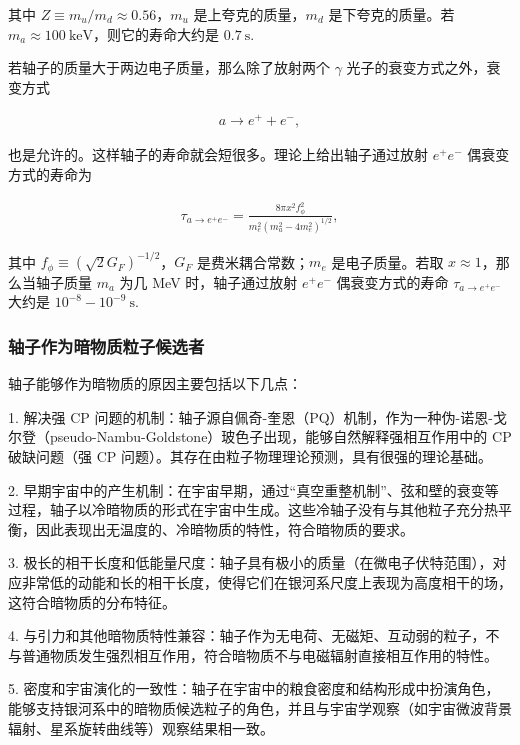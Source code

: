 其中 $Z\equiv m_u/m_d \approx 0.56$，$m_u$ 是上夸克的质量，$m_d$ 是下夸克的质量。若 $m_a\approx 100~\mathrm{keV}$，则它的寿命大约是 $0.7~\mathrm{s} .$

若轴子的质量大于两边电子质量，那么除了放射两个 $\gamma$ 光子的衰变方式之外，衰变方式

\begin{align}
a \to e^+ + e^-,
\end{align}

也是允许的。这样轴子的寿命就会短很多。理论上给出轴子通过放射 $e^+ e^-$ 偶衰变方式的寿命为

\begin{align}
\tau_{a\to e^+ e^-}
=\frac{8 \pi x^2 f_\phi^2}{m_e^2\left(m_a^2-4m_e^2 \right)^{1/2} } ,
\end{align}

其中 $f_\phi\equiv \left(\sqrt{2} G_F \right)^{-1/2}$，$G_F$ 是费米耦合常数；$m_e$ 是电子质量。若取 $x\approx 1$，那么当轴子质量 $m_a$ 为几 MeV 时，轴子通过放射 $e^+ e^-$ 偶衰变方式的寿命 $\tau_{a\to e^+ e^-}$ 大约是 $10^{-8} - 10^{-9}~\mathrm{s} .$

\subsubsection{轴子作为暗物质粒子候选者}

轴子能够作为暗物质的原因主要包括以下几点\cite{duffy2009axions}：

1. 解决强 CP 问题的机制：轴子源自佩奇-奎恩（PQ）机制，作为一种伪-诺恩-戈尔登（pseudo-Nambu-Goldstone）玻色子出现，能够自然解释强相互作用中的 CP 破缺问题（强 CP 问题）。其存在由粒子物理理论预测，具有很强的理论基础。

2. 早期宇宙中的产生机制：在宇宙早期，通过“真空重整机制”、弦和壁的衰变等过程，轴子以冷暗物质的形式在宇宙中生成。这些冷轴子没有与其他粒子充分热平衡，因此表现出无温度的、冷暗物质的特性，符合暗物质的要求。

3. 极长的相干长度和低能量尺度：轴子具有极小的质量（在微电子伏特范围），对应非常低的动能和长的相干长度，使得它们在银河系尺度上表现为高度相干的场，这符合暗物质的分布特征。

4. 与引力和其他暗物质特性兼容：轴子作为无电荷、无磁矩、互动弱的粒子，不与普通物质发生强烈相互作用，符合暗物质不与电磁辐射直接相互作用的特性。

5. 密度和宇宙演化的一致性：轴子在宇宙中的粮食密度和结构形成中扮演角色，能够支持银河系中的暗物质候选粒子的角色，并且与宇宙学观察（如宇宙微波背景辐射、星系旋转曲线等）观察结果相一致。

